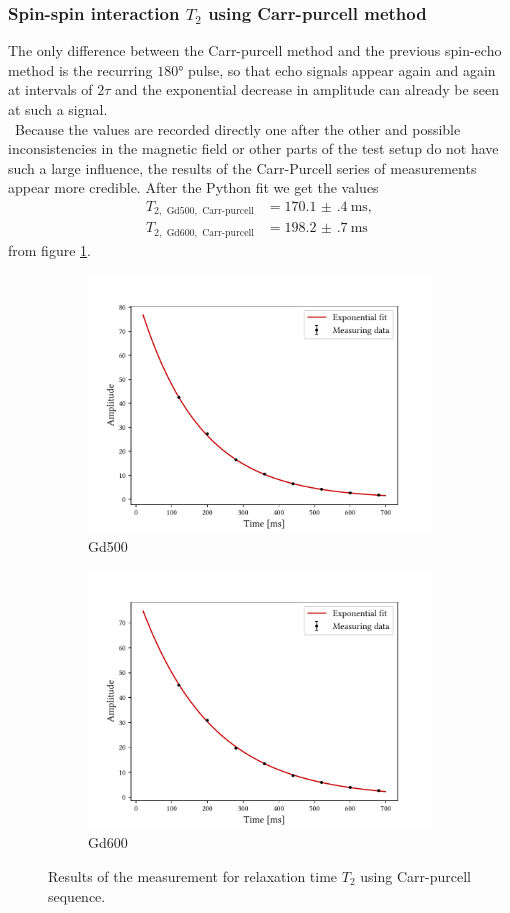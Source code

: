 \subsubsection{Spin-spin interaction $T_2$ using Carr-purcell method}
The only difference between the Carr-purcell method and the previous spin-echo method is the recurring $\ang{180}$ pulse, so that echo signals appear again and again at intervals of $2\tau$ and the exponential decrease in amplitude can already be seen at such a signal. \\\
Because the values are recorded directly one after the other and possible inconsistencies in the magnetic field or other parts of the test setup do not have such a large influence, the results of the Carr-Purcell series of measurements appear more credible.
After the Python fit we get the values
\begin{align*}
T_{2,\text{ Gd500},\text{ Carr-purcell}}&=\SI{170.1(4)}{\milli\second},\\
T_{2,\text{ Gd600},\text{ Carr-purcell}}&=\SI{198.2(7)}{\milli\second}
\end{align*}
from figure \ref{fig:t2cp}.
\begin{figure}[ht]
\begin{subfigure}{.45\textwidth}
\includegraphics[width=9.3cm]{..//figures//f61_abb_3.pdf}
\caption{Gd500}
\end{subfigure}
\qquad
\begin{subfigure}{.45\textwidth}
\includegraphics[width=9.3cm]{..//figures//f61_abb_3_600.pdf}
\caption{Gd600}
\end{subfigure}
\caption{Results of the measurement for relaxation time $T_2$ using Carr-purcell sequence.}
\label{fig:t2cp}
\end{figure}

